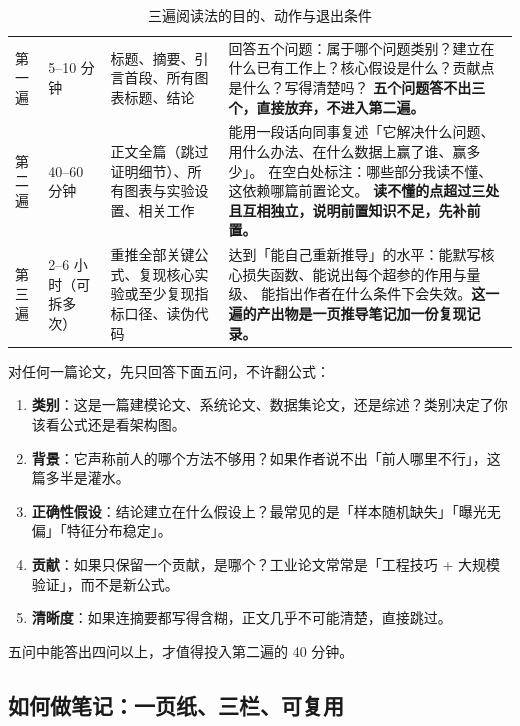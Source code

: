 \begin{table}[htbp]
\centering
\caption{三遍阅读法的目的、动作与退出条件}
\label{tab:three-pass}
\small
\begin{tabularx}{\textwidth}{L{1.5cm} L{1.4cm} L{3.0cm} Y}
\toprule
{} &  &  &  \\
\midrule
第一遍 &
5--10 分钟 &
标题、摘要、引言首段、所有图表标题、结论 &
回答五个问题：属于哪个问题类别？建立在什么已有工作上？核心假设是什么？贡献点是什么？写得清楚吗？
\textbf{五个问题答不出三个，直接放弃，不进入第二遍。} \\
\midrule
第二遍 &
40--60 分钟 &
正文全篇（跳过证明细节）、所有图表与实验设置、相关工作 &
能用一段话向同事复述「它解决什么问题、用什么办法、在什么数据上赢了谁、赢多少」。
在空白处标注：哪些部分我读不懂、这依赖哪篇前置论文。
\textbf{读不懂的点超过三处且互相独立，说明前置知识不足，先补前置。} \\
\midrule
第三遍 &
2--6 小时（可拆多次） &
重推全部关键公式、复现核心实验或至少复现指标口径、读伪代码 &
达到「能自己重新推导」的水平：能默写核心损失函数、能说出每个超参的作用与量级、
能指出作者在什么条件下会失效。\textbf{这一遍的产出物是一页推导笔记加一份复现记录。} \\
\bottomrule
\end{tabularx}
\end{table}

\begin{toolbox}
对任何一篇论文，先只回答下面五问，不许翻公式：
\begin{enumerate}
  \item \textbf{类别}：这是一篇建模论文、系统论文、数据集论文，还是综述？类别决定了你该看公式还是看架构图。
  \item \textbf{背景}：它声称前人的哪个方法不够用？如果作者说不出「前人哪里不行」，这篇多半是灌水。
  \item \textbf{正确性假设}：结论建立在什么假设上？最常见的是「样本随机缺失」「曝光无偏」「特征分布稳定」。
  \item \textbf{贡献}：如果只保留一个贡献，是哪个？工业论文常常是「工程技巧 + 大规模验证」，而不是新公式。
  \item \textbf{清晰度}：如果连摘要都写得含糊，正文几乎不可能清楚，直接跳过。
\end{enumerate}
五问中能答出四问以上，才值得投入第二遍的 40 分钟。
\end{toolbox}

\subsection{如何做笔记：一页纸、三栏、可复用}

